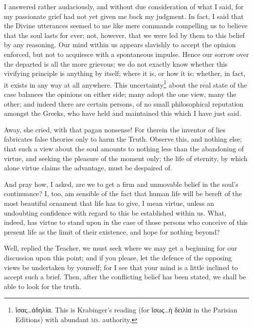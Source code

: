 I answered rather audaciously, and without due consideration of what I said, for my passionate grief had not yet given me back my judgment. In fact, I said that the Divine utterances seemed to me like mere commands compelling us to believe that the soul lasts for ever; not, however, that we were led by them to this belief by any reasoning. Our mind within us appears slavishly to accept the opinion enforced, but not to acquiesce with a spontaneous impulse. Hence our sorrow over the departed is all the more grievous; we do not exactly know whether this vivifying principle is anything by itself; where it is, or how it is; whether, in fact, it exists in any way at all anywhere. This uncertainty\footnote{\textgreek{ἴσας…ἀδηλία}. This is Krabinger’s reading (for \textgreek{ἴσως…ἡ δειλία} in the Parisian Editions) with abundant \textsc{ms.} authority.} about the real state of the case balances the opinions on either side; many adopt the one view, many the other; and indeed there are certain persons, of no small philosophical reputation amongst the Greeks, who have held and maintained this which I have just said.

Away, she cried, with that pagan nonsense! For therein the inventor of lies fabricates false theories only to harm the Truth. Observe this, and nothing else; that such a view about the soul amounts to nothing less than the abandoning of virtue, and seeking the pleasure of the moment only; the life of eternity, by which alone virtue claims the advantage, must be despaired of.

And pray how, I asked, are we to get a firm and unmovable belief in the soul’s continuance? I, too, am sensible of the fact that human life will be bereft of the most beautiful ornament that life has to give, I mean virtue, unless an undoubting confidence with regard to this be established within us. What, indeed, has virtue to stand upon in the case of those persons who conceive of this present life as the limit of their existence, and hope for nothing beyond?

Well, replied the Teacher, we must seek where we may get a beginning for our discussion upon this point; and if you please, let the defence of the opposing views be undertaken by yourself; for I see that your mind is a little inclined to accept such a brief. Then, after the conflicting belief has been stated, we shall be able to look for the truth.

